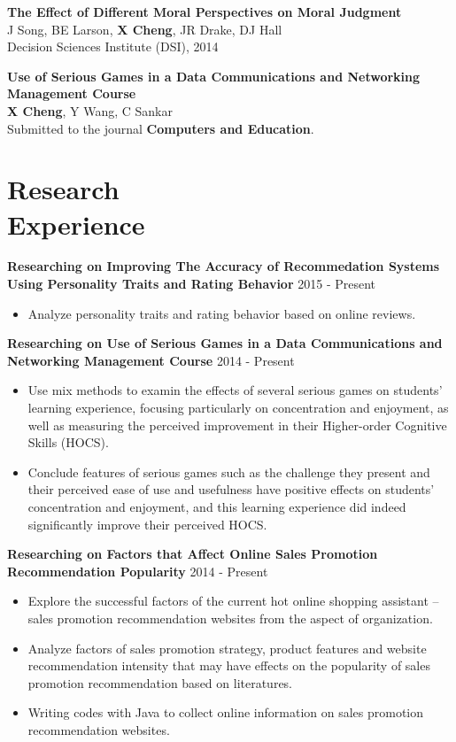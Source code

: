 \documentclass[11pt,margin,line]{res}
\newcommand{\bulletindent}{11pt}
\begin{document}
\begin{resume}
{\bf The Effect of Different Moral Perspectives on Moral Judgment}\\
J Song, BE Larson, {\bf X Cheng}, JR Drake, DJ Hall\\
Decision Sciences Institute (DSI), 2014

{\bf Use of Serious Games in a Data Communications and Networking Management Course}\\
{\bf X Cheng}, Y Wang, C Sankar\\
Submitted to the journal {\bf Computers and Education}.

\section{Research\\Experience}
{\bf Researching on Improving The Accuracy of Recommedation Systems Using Personality Traits and Rating Behavior} \hfill 2015 - Present\\
    \begin{itemize}[leftmargin=\bulletindent]
        \itemsep -2pt
        \item Analyze personality traits and rating behavior based on online reviews.
    \end{itemize}
{\bf Researching on Use of Serious Games in a Data Communications and Networking Management Course} \hfill 2014 - Present\\
    \begin{itemize}[leftmargin=\bulletindent]
        \itemsep -2pt
        \item Use mix methods to examin the effects of several serious games on students’ learning experience, focusing particularly on concentration and enjoyment, as well as measuring the perceived improvement in their Higher-order Cognitive Skills (HOCS). 
        \item Conclude features of serious games such as the challenge they present and their perceived ease of use and usefulness have positive effects on students’ concentration and enjoyment, and this learning experience did indeed significantly improve their perceived HOCS.
    \end{itemize}

{\bf Researching on Factors that Affect Online Sales Promotion Recommendation Popularity} \hfill 2014 - Present\\
    \begin{itemize}[leftmargin=\bulletindent]
        \itemsep -2pt
        \item Explore the successful factors of the current hot online shopping assistant – sales promotion recommendation websites from the aspect of organization.
        \item Analyze factors of sales promotion strategy, product features and website recommendation intensity that may have effects on the popularity of sales promotion recommendation based on literatures.
        \item Writing codes with Java to collect online information on sales promotion recommendation websites.
    \end{itemize}


\end{resume}
\end{document}
